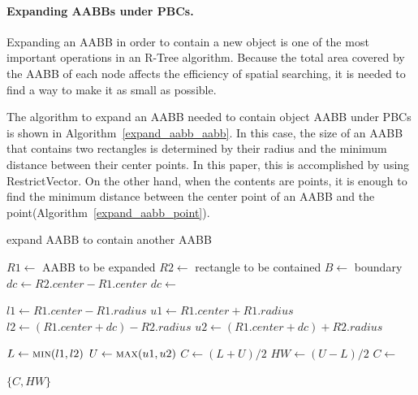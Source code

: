 \documentclass[10pt,letterpaper,twocolumn]{article}
\begin{document}
\paragraph{Expanding AABBs under PBCs.}
Expanding an AABB in order to contain a new object is one of the most
important operations in an R-Tree algorithm.
Because the total area covered by the AABB of each node affects the efficiency
of spatial searching, it is needed to find a way to make it as small as possible.

The algorithm to expand an AABB needed to contain object AABB under PBCs is
shown in Algorithm~\ref{expand_aabb_aabb}.
In this case, the size of an AABB that contains two rectangles is determined
by their radius and the minimum distance between their center points.
In this paper, this is accomplished by using RestrictVector. On the other hand,
when the contents are points, it is enough to find the minimum distance between
the center point of an AABB and the point(Algorithm~\ref{expand_aabb_point}).

\begin{algorithm}[tb]
    \caption{expand AABB to contain another AABB}
    \label{expand_aabb_aabb}
    \begin{algorithmic}
        \State $R1 \gets$ AABB to be expanded
        \State $R2 \gets$ rectangle to be contained
        \State $B  \gets$ boundary
            \State $dc \gets R2.center - R1.center$
            \State $dc \gets$ 

            \State $l1 \gets R1.center - R1.radius$
            \State $u1 \gets R1.center + R1.radius$
            \State $l2 \gets (R1.center + dc) - R2.radius$
            \State $u2 \gets (R1.center + dc) + R2.radius$

            \State $L  \gets \Call{min}{l1, l2}$
            \State $U  \gets \Call{max}{u1, u2}$
            \State $C  \gets (L + U) / 2$
            \State $HW \gets (U - L) / 2$
            \State $C  \gets$ 

            \State \Return $\{C, HW\}$
        \EndFunction
     \end{algorithmic}
\end{algorithm}
\end{document}
